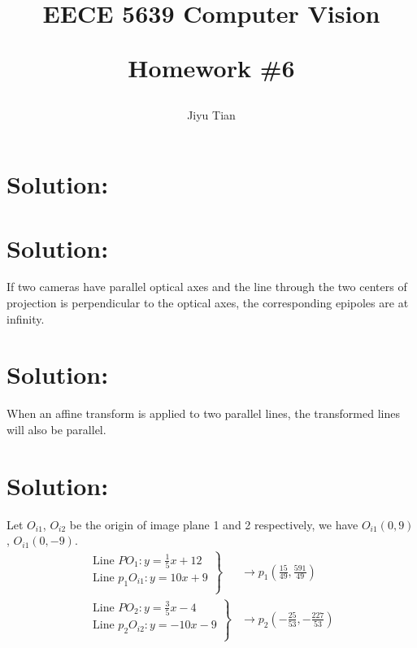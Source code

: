 \documentclass[12pt]{article}
\title{EECE 5639 Computer Vision\\ [2ex] \begin{large} Homework \#6 \end{large} }
\author{Jiyu Tian}
\date{}
\begin{document}
\maketitle
\pagestyle{empty}
\section{Solution:}

\section{Solution:}
If two cameras have parallel optical axes and the line through the two centers of projection is perpendicular to the optical axes, the corresponding epipoles are at infinity.

\section{Solution:}


When an affine transform is applied to two parallel lines, the transformed lines will also be parallel.
\section{Solution:}
Let $O_{i1}$, $O_{i2}$ be the origin of image plane 1 and 2 respectively, we have $O_{i1}(0,9)$, $O_{i1}(0, -9)$.
\begin{equation*}  
\begin{aligned}
\left.  
     \begin{array}{cc}  
        \text{Line } PO_1: y = \frac{1}{5}x + 12\\
        \text{Line } p_1O_{i1}: y = 10x + 9\\  
     \end{array}  
\right\}&\to  p_1(\frac{15}{49}, \frac{591}{49})\\
\left.  
     \begin{array}{cc}  
        \text{Line } PO_2: y = \frac{3}{5}x -4 \\
        \text{Line } p_2O_{i2}: y = -10x - 9\\  
     \end{array}  
\right\}&\to  p_2(-\frac{25}{53}, -\frac{227}{53})
\end{aligned}
\end{equation*}  
\end{document}
